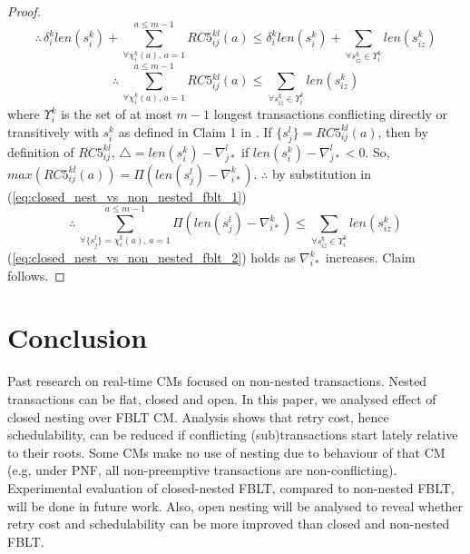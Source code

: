 \documentclass[preprint]{sigplanconf}
\begin{document}
\begin{proof}
\[
\therefore\,\delta_{i}^{k}len\left(s_{i}^{k}\right)+\sum_{\forall\chi_{i}^{k}(a),\, a=1}^{a\le m-1}RC5_{ij}^{kl}(a)\le\delta_{i}^{k}len\left(s_{i}^{k}\right)+\sum_{\forall s_{iz}^{k}\in\Upsilon_{i}^{k}}len\left(s_{iz}^{k}\right)
\]
\begin{equation}
\therefore\,\sum_{\forall\chi_{i}^{k}(a),\, a=1}^{a\le m-1}RC5{}_{ij}^{kl}(a)\le\sum_{\forall s_{iz}^{k}\in\Upsilon_{i}^{k}}len\left(s_{iz}^{k}\right)\label{eq:closed_nest_vs_non_nested_fblt_1}
\end{equation}
where $\Upsilon_{i}^{k}$ is the set of at most $m-1$ longest transactions
conflicting directly or transitively with $s_{i}^{k}$ as defined
in Claim 1 in \cite{fblt}. If $\{s_{j}^{l}\}=RC5_{ij}^{kl}(a)$,
then by definition of $RC5_{ij}^{kl}$, $\triangle=len(s_{i}^{k})-\nabla_{j*}^{l}$
if $len(s_{i}^{k})-\nabla_{j*}^{l}<0$. So, $max\left(RC5_{ij}^{kl}(a)\right)=\Pi\left(len(s_{j}^{l})-\nabla_{i*}^{k}\right)$.
$\therefore$ by substitution in (\ref{eq:closed_nest_vs_non_nested_fblt_1})
\begin{equation}
\therefore\,\sum_{\forall\{s_{j}^{l}\}=\chi_{i}^{k}(a),\, a=1}^{a\le m-1}\Pi\left(len(s_{j}^{l})-\nabla_{i*}^{k}\right)\le\sum_{\forall s_{iz}^{k}\in\Upsilon_{i}^{k}}len\left(s_{iz}^{k}\right)\label{eq:closed_nest_vs_non_nested_fblt_2}
\end{equation}
(\ref{eq:closed_nest_vs_non_nested_fblt_2}) holds as $\nabla_{i*}^{k}$
increases. Claim follows.
%
\end{proof}
%
\section{Conclusion}\label{sec:conclusion}

Past research on real-time CMs focused on non-nested transactions. Nested transactions can be flat, closed and open. In this paper, we analysed effect of closed nesting over FBLT CM. Analysis shows that retry cost, hence schedulability, can be reduced if conflicting (sub)transactions start lately relative to their roots. Some CMs make no use of nesting due to behaviour of that CM (e.g, under PNF, all non-preemptive transactions are non-conflicting). Experimental evaluation of closed-nested FBLT, compared to non-nested FBLT, will be done in future work. Also, open nesting will be analysed to reveal whether retry cost and schedulability can be more improved than closed and non-nested FBLT. 



\end{document}
